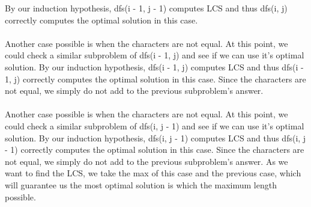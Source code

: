 \documentclass[12pt,letterpaper]{article}
\begin{document}
\begin{enumerate}
\begin{enumerate}[a)]
        By our induction hypothesis, dfs(i - 1, j - 1) computes LCS 
        and thus dfs(i, j) correctly computes the optimal solution in this case. \\\\
        Another case possible is when the characters are not equal. 
        At this point, we could check a similar subproblem of dfs(i - 1, j) and see if we can use it's optimal solution.
        By our induction hypothesis, dfs(i - 1, j) computes LCS and thus dfs(i - 1, j) 
        correctly computes the optimal solution in this case. 
        Since the characters are not equal, we simply do not add to the previous subproblem's answer. \\\\
        Another case possible is when the characters are not equal. 
        At this point, we could check a similar subproblem of dfs(i, j - 1) and see if we can use it's optimal solution.
        By our induction hypothesis, dfs(i, j - 1) computes LCS and thus dfs(i, j - 1) 
        correctly computes the optimal solution in this case.
        Since the characters are not equal, we simply do not add to the previous subproblem's answer.
        As we want to find the LCS, we take the max of this case and the previous case, 
        which will guarantee us the most optimal solution is which the maximum length possible.
    \end{enumerate}
\end{enumerate}
\end{document}
